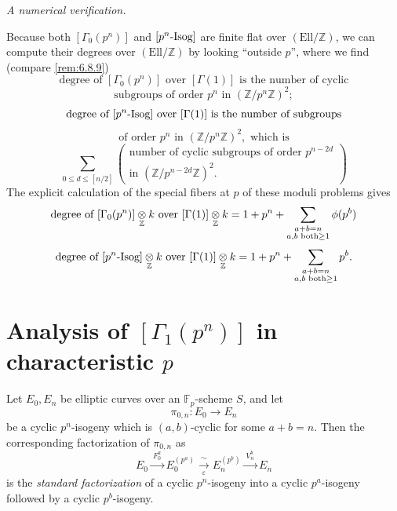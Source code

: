 \kmitem\label{item:13.4.9}\emph{A numerical verification.}\par
Because both $[\Gamma_0(p^n)]$ and $[p^n\text{-\rm Isog}]$ are finite flat over $(\mathrm{Ell}/\mathbb{Z})$, we can compute their degrees over $(\mathrm{Ell}/\mathbb{Z})$ by looking ``outside $p$'', where we find (compare \ref{rem:6.8.9})
\[
\text{degree of } [\Gamma_0(p^n)] \text{ over } [\Gamma(1)] \text{ is the number of cyclic}
\]
\[
\text{subgroups of order } p^n \text{ in } (\mathbb{Z}/p^n\mathbb{Z})^2 ;
\]
\[
\text{degree of } [p^n\text{-\rm Isog}] \text{ over } [\Gamma(1)] \text{ is the number of subgroups}
\]
\[
\text{of order } p^n \text{ in } (\mathbb{Z}/p^n\mathbb{Z})^2 , \text{ which is}
\]
\[
\sum_{0 \le d \le [n/2]} \begin{pmatrix}
\text{number of cyclic subgroups of order } p^{n-2d} \\
\text{in } (\mathbb{Z}/p^{n-2d}\mathbb{Z})^2 .
\end{pmatrix}
\]
The explicit calculation of the special fibers at $p$ of these moduli problems gives
\[
\text{degree of } [\Gamma_0(p^n)] \underset{\mathbb{Z}}{\otimes} k \text{ over } [\Gamma(1)] \underset{\mathbb{Z}}{\otimes} k = 1 + p^n + \sum_{\substack{a+b=n \\ a, b \text{ both} \ge 1}} \phi(p^b)
\]
\[
\text{degree of } [p^n\text{-\rm Isog}] \underset{\mathbb{Z}}{\otimes} k \text{ over } [\Gamma(1)] \underset{\mathbb{Z}}{\otimes} k = 1 + p^n + \sum_{\substack{a+b=n \\ a, b \text{ both} \ge 1}} p^b .
\]

\section{Analysis of \texorpdfstring{$[\Gamma_1(p^n)]$}{[Gamma_1(p^n)]} in characteristic \texorpdfstring{$p$}{p}}
\label{sec:13.5}

\begin{kprop}\label{prop:13.5.1}
Let $E_0, E_n$ be elliptic curves over an $\mathbb{F}_p$-scheme $S$, and let
\[
\pi_{0,n} : E_0 \to E_n
\]
be a cyclic $p^n$-isogeny which is $(a,b)$-cyclic for some $a + b = n$. Then the corresponding factorization of $\pi_{0,n}$ as
\[
E_0 \xrightarrow{\ F_0^a\ } E_0^{(p^a)} \xrightarrow[\varepsilon]{\ \sim\ } E_n^{(p^b)} \xrightarrow{\ V_n^b\ } E_n
\]
is the \emph{standard factorization} of a cyclic $p^n$-isogeny into a cyclic $p^a$-isogeny followed by a cyclic $p^b$-isogeny.
\end{kprop}

